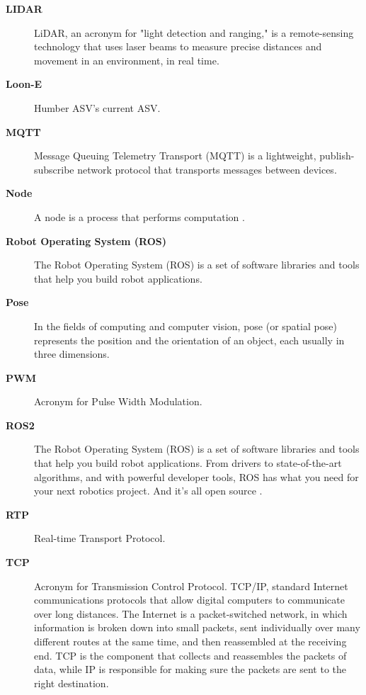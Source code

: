 \begin{description}
	\item[\textbf{LIDAR}]
	LiDAR, an acronym for "light detection and ranging," is a remote-sensing technology that uses laser beams to measure precise distances and movement in an environment, in real time.\autocite{LIDAR}

	\item[\textbf{Loon-E}]	
	Humber ASV's current ASV.\autocite{HUMBERASVTEAM}
	
	\item[\textbf{MQTT}]
	Message Queuing Telemetry Transport (MQTT) is a lightweight, publish-subscribe network protocol that transports messages between devices.\autocite{MQTT}

	\item[\textbf{Node}]
	A node is a process that performs computation \autocite{NODEDEFINITION}.

	\item[\textbf{Robot Operating System (ROS)}]	
	The Robot Operating System (ROS) is a set of software libraries and tools that help you build robot applications.\autocite{ROS}

	\item[\textbf{Pose}]
	In the fields of computing and computer vision, pose (or spatial pose) represents the position and the orientation of an object, each usually in three dimensions. \autocite{HoffNguyenLyon1996}

	\item[\textbf{PWM}]
	Acronym for Pulse Width Modulation.\autocite{PWMDICTIONARY}

	\item[\textbf{ROS2}]
	The Robot Operating System (ROS) is a set of software libraries and tools that help you build robot applications. From drivers to state-of-the-art algorithms, and with powerful developer tools, ROS has what you need for your next robotics project. And it's all open source \autocite{ROS2Humble}.
	
	\item[\textbf{RTP}]
	Real-time Transport Protocol.

	\item[\textbf{TCP}]
	Acronym for Transmission Control Protocol. TCP/IP, standard Internet communications protocols that allow digital computers to communicate over long distances. The Internet is a packet-switched network, in which information is broken down into small packets, sent individually over many different routes at the same time, and then reassembled at the receiving end. TCP is the component that collects and reassembles the packets of data, while IP is responsible for making sure the packets are sent to the right destination.\autocite{TCPIPDICTIONARY}


\end{description}
